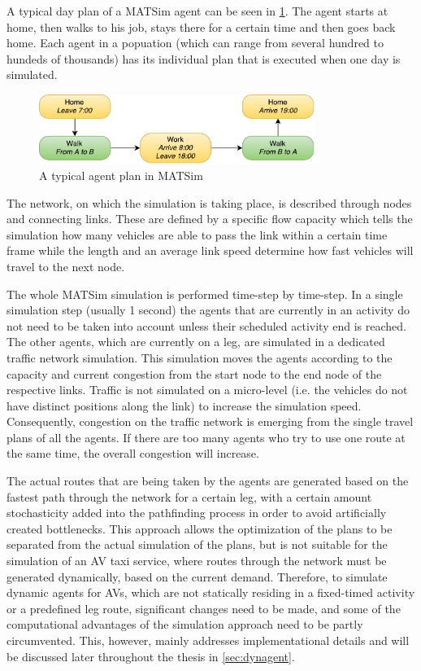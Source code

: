 A typical day plan of a MATSim agent can be seen in \cref{fig:typical_plan}. The
agent starts at home, then walks to his job, stays there for a certain time and then
goes back home. Each agent in a popuation (which can range from several hundred to
hundeds of thousands) has its individual plan that is executed when one day
is simulated.

\begin{figure}
    \centering
    \includegraphics[width=0.8\textwidth]{figures/simpleplan.pdf}
    \caption{A typical agent plan in MATSim}
    \label{fig:typical_plan}
\end{figure}

The network, on which the simulation is taking place, is described through nodes
and connecting links. These are defined by a specific flow capacity which tells the
simulation how many vehicles are able to pass the link within a certain time
frame while the length and an average link speed determine how fast vehicles
will travel to the next node.

The whole MATSim simulation is performed time-step by time-step. In a single simulation step (usually 1 second)
the agents that are currently in an activity do not need to be taken into account unless their scheduled
activity end is reached. The other agents, which are currently on a leg, are simulated in a
dedicated traffic network simulation. This simulation moves the agents according
to the capacity and current congestion from the start node to the end node of the
respective links. Traffic is not simulated on a micro-level (i.e. the vehicles
do not have distinct positions along the link) to increase the simulation
speed. Consequently, congestion on the traffic network is emerging from the single travel
plans of all the agents. If there are too many agents who try to use one route
at the same time, the overall congestion will increase.

The actual routes that are being taken by the agents are generated based on the
fastest path through the network for a certain leg, with a certain amount stochasticity
added into the pathfinding process in order to avoid artificially created bottlenecks.
This approach allows the optimization of the plans to be separated from the actual
simulation of the plans, but is not suitable for the simulation of an AV taxi service,
where routes through the network must be generated dynamically, based on the current
demand. Therefore, to simulate dynamic agents for AVs, which are not statically residing in a
fixed-timed activity or a predefined leg route, significant changes need
to be made, and some of the computational advantages of the simulation approach
need to be partly circumvented. This, however, mainly addresses implementational
details and will be discussed later throughout the thesis in \cref{sec:dynagent}.

